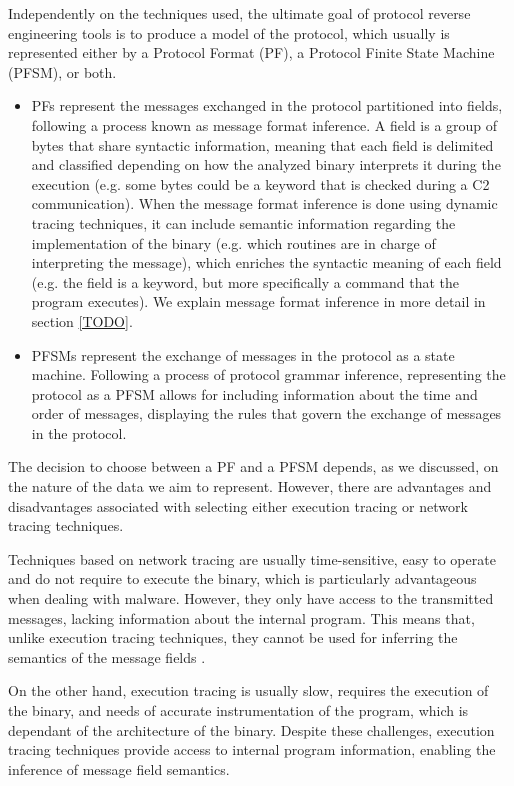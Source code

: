 \documentclass[conference]{IEEEtran}
\begin{document}
Independently on the techniques used, the ultimate goal of protocol reverse
engineering tools is to produce a model of the protocol, which usually is
represented either by a Protocol Format (PF), a Protocol Finite State Machine
(PFSM), or both.
\begin{itemize}
    \item PFs represent the messages exchanged in the protocol partitioned into fields,
          following a process known as message format inference. A field is a group of
          bytes that share syntactic information, meaning that each field is delimited
          and classified depending on how the analyzed binary interprets it during the
          execution \cite{polyglot_caballero} (e.g. some bytes could be a keyword that is
          checked during a C2 communication). When the message format inference is done
          using dynamic tracing techniques, it can include semantic information regarding
          the implementation of the binary (e.g. which routines are in charge of
          interpreting the message), which enriches the syntactic meaning of each field
          (e.g. the field is a keyword, but more specifically a command that the program
          executes). We explain message format inference in more detail in section
          \ref{TODO}.
    \item PFSMs represent the exchange of messages in the protocol as a state machine.
          Following a process of protocol grammar inference, representing the protocol as
          a PFSM allows for including information about the time and order of messages,
          displaying the rules that govern the exchange of messages in the protocol.
\end{itemize}

The decision to choose between a PF and a PFSM depends, as we discussed, on the
nature of the data we aim to represent. However, there are advantages and
disadvantages associated with selecting either execution tracing or network
tracing techniques.

Techniques based on network tracing are usually time-sensitive, easy to operate
and do not require to execute the binary, which is particularly advantageous
when dealing with malware. However, they only have access to the transmitted
messages, lacking information about the internal program. This means that,
unlike execution tracing techniques, they cannot be used for inferring the
semantics of the message fields \cite{apre_survey}.

On the other hand, execution tracing is usually slow, requires the execution of
the binary, and needs of accurate instrumentation of the program, which is
dependant of the architecture of the binary. Despite these challenges,
execution tracing techniques provide access to internal program information,
enabling the inference of message field semantics.
\end{document}
